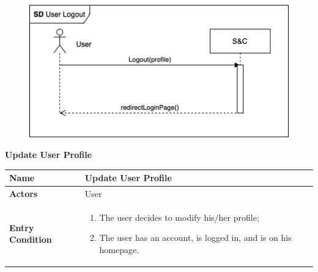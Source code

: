 \begin{enumerate}[label=\textbf{[US\arabic*]}, left = 0pt, align = left]
\begin{longtable}{|l|p{11cm}|}
            \end{longtable}

                \begin{figure}[h!]
                \centering
                    \includegraphics[width=1\textwidth]{RASD/Images/UseCases/UserLogout.drawio.png}
                \label{fig:example}
                \end{figure}

            \newpage
            
            \item \textbf{Update User Profile}
            
            \begin{longtable}{|l|p{11cm}|}  
                \hline
                \textbf{Name} & 
                    \textbf{Update User Profile} \\
                \hline
                
                \textbf{Actors} & 
                    User \\
                \hline

                \textbf{Entry Condition} & 
                    \begin{enumerate}[label=\textbullet, itemsep=0em]
                        \item The user decides to modify his/her profile;
                        \item The user has an account, is logged in, and is on his homepage.
                    \end{enumerate} \\
                \hline
                

\end{longtable}
\end{enumerate}
